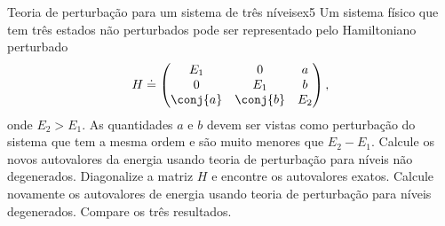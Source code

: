 \begin{exercício}{Teoria de perturbação para um sistema de três níveis}{ex5}
    Um sistema físico que tem três estados não perturbados pode ser representado pelo Hamiltoniano perturbado
    \begin{equation*}
        H \doteq \begin{pmatrix}
           E_1 & 0 & a\\
           0 & E_1 & b\\
           \conj{a} & \conj{b} & E_2
        \end{pmatrix},
    \end{equation*}
    onde \(E_2 > E_1\). As quantidades \(a\) e \(b\) devem ser vistas como perturbação do sistema que tem a mesma ordem e são muito menores que \(E_2 - E_1.\) Calcule os novos autovalores da energia usando teoria de perturbação para níveis não degenerados. Diagonalize a matriz \(H\) e encontre os autovalores exatos. Calcule novamente os autovalores de energia usando teoria de perturbação para níveis degenerados. Compare os três resultados.
\end{exercício}
